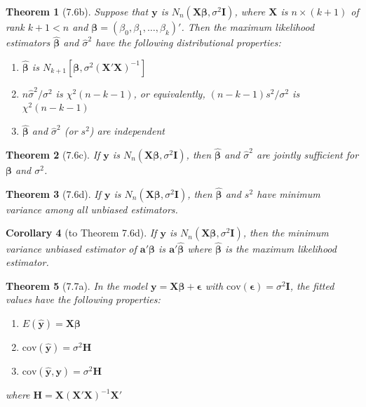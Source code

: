 \documentclass{article}
\newtheorem{theorem}{Theorem}[section]
\newtheorem{corollary}[theorem]{Corollary}
\begin{document}
\begin{theorem}[7.6b]
Suppose that $\mathbf{y}$ is $N_n(\mathbf{X}\boldsymbol{\beta}, \sigma^2\mathbf{I})$, where $\mathbf{X}$ is $n \times (k+1)$ of rank $k+1 < n$ and $\boldsymbol{\beta} = (\beta_0, \beta_1, \ldots, \beta_k)'$. Then the maximum likelihood estimators $\hat{\boldsymbol{\beta}}$ and $\hat{\sigma}^2$ have the following distributional properties:
\begin{enumerate}[label=(\roman*)]
\item $\hat{\boldsymbol{\beta}}$ is $N_{k+1}[\boldsymbol{\beta}, \sigma^2(\mathbf{X}'\mathbf{X})^{-1}]$
\item $n\hat{\sigma}^2/\sigma^2$ is $\chi^2(n-k-1)$, or equivalently, $(n-k-1)s^2/\sigma^2$ is $\chi^2(n-k-1)$
\item $\hat{\boldsymbol{\beta}}$ and $\hat{\sigma}^2$ (or $s^2$) are independent
\end{enumerate}
\end{theorem}

\begin{theorem}[7.6c]
If $\mathbf{y}$ is $N_n(\mathbf{X}\boldsymbol{\beta}, \sigma^2\mathbf{I})$, then $\hat{\boldsymbol{\beta}}$ and $\hat{\sigma}^2$ are jointly sufficient for $\boldsymbol{\beta}$ and $\sigma^2$.
\end{theorem}

\begin{theorem}[7.6d]
If $\mathbf{y}$ is $N_n(\mathbf{X}\boldsymbol{\beta}, \sigma^2\mathbf{I})$, then $\hat{\boldsymbol{\beta}}$ and $s^2$ have minimum variance among all unbiased estimators.
\end{theorem}

\begin{corollary}[to Theorem 7.6d]
If $\mathbf{y}$ is $N_n(\mathbf{X}\boldsymbol{\beta}, \sigma^2\mathbf{I})$, then the minimum variance unbiased estimator of $\mathbf{a}'\boldsymbol{\beta}$ is $\mathbf{a}'\hat{\boldsymbol{\beta}}$ where $\hat{\boldsymbol{\beta}}$ is the maximum likelihood estimator.
\end{corollary}

\begin{theorem}[7.7a]
In the model $\mathbf{y} = \mathbf{X}\boldsymbol{\beta} + \boldsymbol{\epsilon}$ with $\text{cov}(\boldsymbol{\epsilon}) = \sigma^2\mathbf{I}$, the fitted values have the following properties:
\begin{enumerate}[label=(\roman*)]
\item $E(\hat{\mathbf{y}}) = \mathbf{X}\boldsymbol{\beta}$
\item $\text{cov}(\hat{\mathbf{y}}) = \sigma^2\mathbf{H}$
\item $\text{cov}(\hat{\mathbf{y}}, \mathbf{y}) = \sigma^2\mathbf{H}$
\end{enumerate}
where $\mathbf{H} = \mathbf{X}(\mathbf{X}'\mathbf{X})^{-1}\mathbf{X}'$
\end{theorem}
\end{document}
